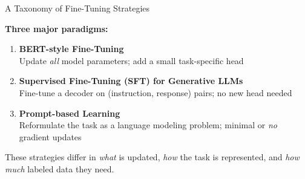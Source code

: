 \documentclass[11pt,compress,t,notes=noshow, xcolor=table]{beamer}
\begin{document}
\begin{frame}{A Taxonomy of Fine-Tuning Strategies}

\vfill

\textbf{Three major paradigms:}

\begin{enumerate}
  \item \textbf{BERT-style Fine-Tuning}\\
        Update \textit{all} model parameters; add a small task-specific head
  \item \textbf{Supervised Fine-Tuning (SFT) for Generative LLMs}\\
        Fine-tune a decoder on (instruction, response) pairs; no new head needed
  \item \textbf{Prompt-based Learning}\\
        Reformulate the task as a language modeling problem; minimal or \textit{no} gradient updates
\end{enumerate}

\vfill

\begin{center}
  These strategies differ in \textit{what} is updated, \textit{how} the task is represented, and \textit{how much} labeled data they need.
\end{center}

\vfill

\end{frame}

\end{document}
